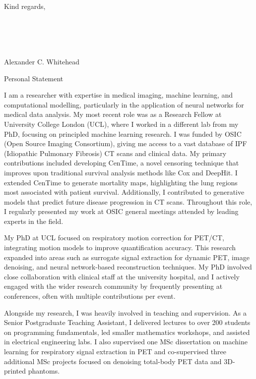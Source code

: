 \documentclass{cv}
\begin{document}
    \begin{rSection}{}
        \item Kind regards,
        \\
        \\
        \\
        \\
        \\
        \item Alexander C. Whitehead
    \end{rSection}

    \newpage

    \begin{rSection}{Personal Statement}
        \item I am a researcher with expertise in medical imaging, machine learning, and computational modelling, particularly in the application of neural networks for medical data analysis. My most recent role was as a Research Fellow at University College London (UCL), where I worked in a different lab from my PhD, focusing on principled machine learning research. I was funded by OSIC (Open Source Imaging Consortium), giving me access to a vast database of IPF (Idiopathic Pulmonary Fibrosis) CT scans and clinical data. My primary contributions included developing CenTime, a novel censoring technique that improves upon traditional survival analysis methods like Cox and DeepHit. I extended CenTime to generate mortality maps, highlighting the lung regions most associated with patient survival. Additionally, I contributed to generative models that predict future disease progression in CT scans. Throughout this role, I regularly presented my work at OSIC general meetings attended by leading experts in the field.

        \item My PhD at UCL focused on respiratory motion correction for PET/CT, integrating motion models to improve quantification accuracy. This research expanded into areas such as surrogate signal extraction for dynamic PET, image denoising, and neural network-based reconstruction techniques. My PhD involved close collaboration with clinical staff at the university hospital, and I actively engaged with the wider research community by frequently presenting at conferences, often with multiple contributions per event.

        \item Alongside my research, I was heavily involved in teaching and supervision. As a Senior Postgraduate Teaching Assistant, I delivered lectures to over 200 students on programming fundamentals, led smaller mathematics workshops, and assisted in electrical engineering labs. I also supervised one MSc dissertation on machine learning for respiratory signal extraction in PET and co-supervised three additional MSc projects focused on denoising total-body PET data and 3D-printed phantoms.


\end{rSection}
\end{document}
